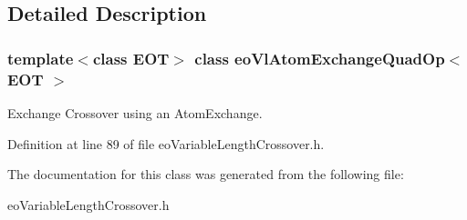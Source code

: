 \subsection{Detailed Description}
\subsubsection*{template$<$class EOT$>$ class eo\-Vl\-Atom\-Exchange\-Quad\-Op$<$ EOT $>$}

Exchange Crossover using an Atom\-Exchange. 



Definition at line 89 of file eo\-Variable\-Length\-Crossover.h.

The documentation for this class was generated from the following file:\begin{CompactItemize}
\item 
eo\-Variable\-Length\-Crossover.h\end{CompactItemize}
